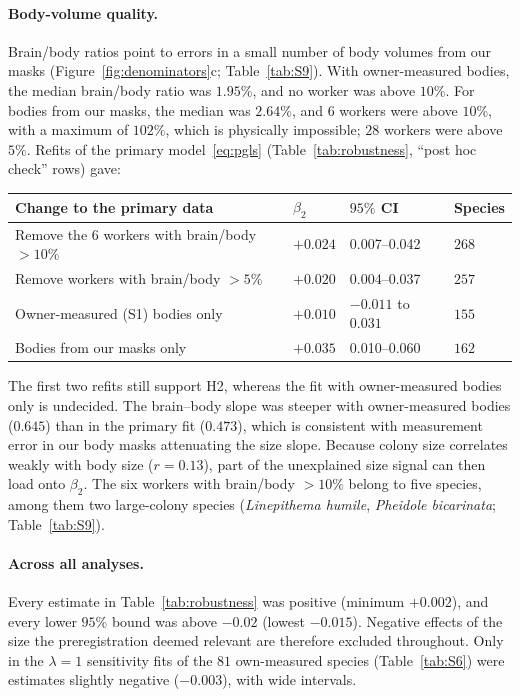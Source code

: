 \documentclass[11pt]{article}
\begin{document}
\paragraph{Body-volume quality.} Brain/body ratios point to errors in a small number of body volumes from our
masks (Figure~\ref{fig:denominators}c; Table~\ref{tab:S9}). With owner-measured bodies, the median brain/body ratio was
$1.95\%$, and no worker was above $10\%$. For bodies from our masks, the median was $2.64\%$, and $6$ workers were above $10\%$,
with a maximum of $102\%$, which is physically impossible; $28$ workers were above $5\%$. Refits of the primary
model~\eqref{eq:pgls} (Table~\ref{tab:robustness}, ``post hoc check'' rows) gave:
\begin{center}
\small
\begin{tabular}{@{}llll@{}}
\toprule
Change to the primary data & $\beta_2$ & $95\%$ CI & Species \\
\midrule
Remove the $6$ workers with brain/body $> 10\%$ & $+0.024$ & 0.007--0.042 & $268$ \\
Remove workers with brain/body $> 5\%$ & $+0.020$ & 0.004--0.037 & $257$ \\
Owner-measured (S1) bodies only & $+0.010$ & $-0.011$ to $0.031$ & $155$ \\
Bodies from our masks only & $+0.035$ & 0.010--0.060 & $162$ \\
\bottomrule
\end{tabular}
\end{center}
The first two refits still support H2, whereas the fit with owner-measured bodies only is undecided. The brain--body
slope was steeper with owner-measured bodies ($0.645$) than in the primary fit ($0.473$), which is consistent with
measurement error in our body masks attenuating the size slope. Because colony size correlates weakly with body size
($r = 0.13$), part of the unexplained size signal can then load onto $\beta_2$. The six workers with brain/body
$> 10\%$ belong to five species, among them two large-colony species (\emph{Linepithema humile}, \emph{Pheidole
bicarinata}; Table~\ref{tab:S9}).

\paragraph{Across all analyses.} Every estimate in Table~\ref{tab:robustness} was positive (minimum $+0.002$), and
every lower $95\%$ bound was above $-0.02$ (lowest $-0.015$). Negative effects of the size the preregistration deemed
relevant are therefore excluded throughout. Only in the $\lambda = 1$ sensitivity fits of the $81$ own-measured species
(Table~\ref{tab:S6}) were estimates slightly negative ($-0.003$), with wide intervals.
\end{document}
